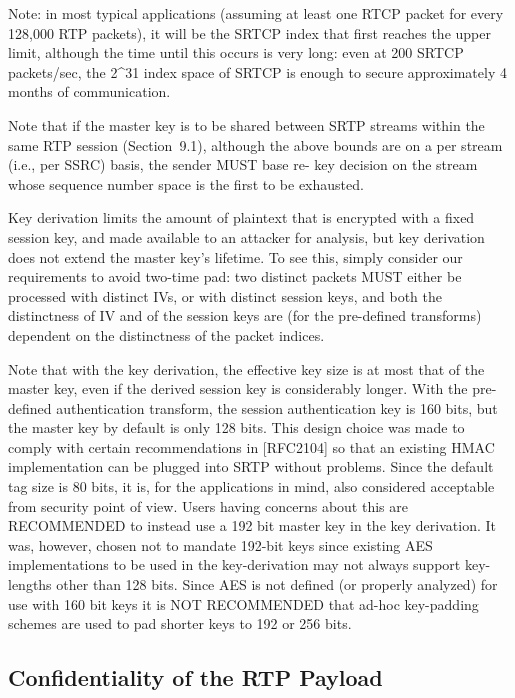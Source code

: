 \documentclass{article}
\begin{document}
Note: in most typical applications (assuming at least one RTCP packet for every 128,000 RTP packets), it will be the SRTCP index that first reaches the upper limit, although the time until this occurs is very long: even at 200 SRTCP packets/sec, the 2\textasciicircum{}31 index space of SRTCP is enough to secure approximately 4 months of communication.

Note that if the master key is to be shared between SRTP streams within the same RTP session (Section~9.1), although the above bounds are on a per stream (i.e., per SSRC) basis, the sender MUST base re- key decision on the stream whose sequence number space is the first to be exhausted.

Key derivation limits the amount of plaintext that is encrypted with a fixed session key, and made available to an attacker for analysis, but key derivation does not extend the master key's lifetime.  To see this, simply consider our requirements to avoid two-time pad:  two distinct packets MUST either be processed with distinct IVs, or with distinct session keys, and both the distinctness of IV and of the session keys are (for the pre-defined transforms) dependent on the distinctness of the packet indices.

Note that with the key derivation, the effective key size is at most that of the master key, even if the derived session key is considerably longer.  With the pre-defined authentication transform, the session authentication key is 160 bits, but the master key by default is only 128 bits.  This design choice was made to comply with certain recommendations in [RFC2104] so that an existing HMAC implementation can be plugged into SRTP without problems.  Since the default tag size is 80 bits, it is, for the applications in mind, also considered acceptable from security point of view.  Users having concerns about this are RECOMMENDED to instead use a 192 bit master key in the key derivation.  It was, however, chosen not to mandate 192-bit keys since existing AES implementations to be used in the key-derivation may not always support key-lengths other than 128 bits.  Since AES is not defined (or properly analyzed) for use with 160 bit keys it is NOT RECOMMENDED that ad-hoc key-padding schemes are used to pad shorter keys to 192 or 256 bits.

\subsection{Confidentiality of the RTP Payload}
\end{document}
